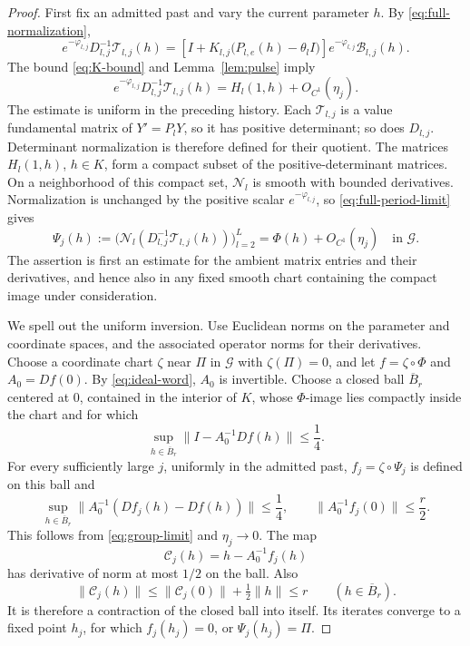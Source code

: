 \begin{proof}
First fix an admitted past and vary the current parameter \(h\).
By \eqref{eq:full-normalization},
\[
 e^{-\varphi_{l,j}}D_{l,j}^{-1}\mathcal T_{l,j}(h)
 =\left[I+K_{l,j}\bigl(P_{l,e}(h)-\theta_lI\bigr)\right]
       e^{-\varphi_{l,j}}\mathcal B_{l,j}(h).
\]
The bound \eqref{eq:K-bound} and Lemma~\ref{lem:pulse} imply
\begin{equation}
 e^{-\varphi_{l,j}}D_{l,j}^{-1}\mathcal T_{l,j}(h)
 =H_l(1,h)+O_{C^1}(\eta_j).
 \label{eq:full-period-limit}
\end{equation}
The estimate is uniform in the preceding history.  Each
\(\mathcal T_{l,j}\) is a value fundamental matrix of
\(Y'=P_lY\), so it has positive determinant; so does \(D_{l,j}\).
Determinant normalization is therefore defined for their
quotient.  The matrices \(H_l(1,h)\), \(h\in K\), form a compact
subset of the positive-determinant matrices.  On a neighborhood
of this compact set, \(\mathcal N_l\) is smooth with bounded
derivatives.  Normalization is unchanged by the positive scalar
\(e^{-\varphi_{l,j}}\), so \eqref{eq:full-period-limit} gives
\begin{equation}
 \Psi_j(h):=
 \bigl(\mathcal N_l(D_{l,j}^{-1}\mathcal T_{l,j}(h))\bigr)_{l=2}^{L}
 =\Phi(h)+O_{C^1}(\eta_j)
 \quad\text{in }\mathcal G.
 \label{eq:group-limit}
\end{equation}
The assertion is first an estimate for the ambient matrix
entries and their derivatives, and hence also in any fixed
smooth chart containing the compact image under consideration.

We spell out the uniform inversion.  Use Euclidean norms on the
parameter and coordinate spaces, and the associated operator norms
for their derivatives.  Choose a coordinate chart
\(\zeta\) near \(\Pi\) in \(\mathcal G\) with \(\zeta(\Pi)=0\),
and let \(f=\zeta\circ\Phi\) and \(A_0=Df(0)\).  By
\eqref{eq:ideal-word}, \(A_0\) is invertible.  Choose a closed
ball \(\overline B_r\) centered at \(0\), contained in the
interior of \(K\), whose \(\Phi\)-image lies compactly inside
the chart and for which
\[
 \sup_{h\in\overline B_r}
 \|I-A_0^{-1}Df(h)\|\leq\frac14.
\]
For every sufficiently large \(j\), uniformly in the admitted
past, \(f_j=\zeta\circ\Psi_j\) is defined on this ball and
\[
 \sup_{h\in\overline B_r}
 \|A_0^{-1}(Df_j(h)-Df(h))\|\leq\frac14,\qquad
 \|A_0^{-1}f_j(0)\|\leq\frac r2.
\]
This follows from \eqref{eq:group-limit} and \(\eta_j\to0\).
The map
\[
 \mathcal C_j(h)=h-A_0^{-1}f_j(h)
\]
has derivative of norm at most \(1/2\) on the ball.  Also
\[
 \|\mathcal C_j(h)\|
 \leq\|\mathcal C_j(0)\|+\tfrac12\|h\|
 \leq r
 \qquad(h\in\overline B_r).
\]
It is therefore a contraction of the closed ball into itself.
Its iterates converge to a fixed point \(h_j\), for which
\(f_j(h_j)=0\), or \(\Psi_j(h_j)=\Pi\).


\end{proof}
